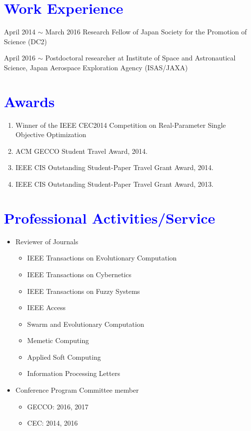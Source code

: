 \documentclass[letterpaper]{article}
\begin{document}
\section{\textcolor{blue}{Work Experience}}

\begin{CV}
\item[April 2014 $\sim$ March 2016] Research Fellow of Japan Society for the Promotion of Science (DC2)
\item[April 2016 $\sim$] Postdoctoral researcher at Institute of Space and Astronautical Science, Japan Aerospace Exploration Agency (ISAS/JAXA)
\end{CV}



\section{\textcolor{blue}{Awards}}

\begin{enumerate}
\item Winner of the IEEE CEC2014 Competition on Real-Parameter Single Objective Optimization 
\item ACM GECCO Student Travel Award, 2014.
\item IEEE CIS Outstanding Student-Paper Travel Grant Award, 2014.
\item IEEE CIS Outstanding Student-Paper Travel Grant Award, 2013.
\end{enumerate}


\section{\textcolor{blue}{Professional Activities/Service}}
\begin{itemize}
\item Reviewer of Journals
\begin{itemize}
\item IEEE Transactions on Evolutionary Computation
\item IEEE Transactions on Cybernetics
\item IEEE Transactions on Fuzzy Systems
\item IEEE Access
\item Swarm and Evolutionary Computation
\item Memetic Computing
\item Applied Soft Computing
\item Information Processing Letters
\end{itemize}
\item Conference Program Committee member
\begin{itemize}
\item GECCO: 2016, 2017
\item CEC: 2014, 2016
\end{itemize}
\end{itemize}
\end{document}
